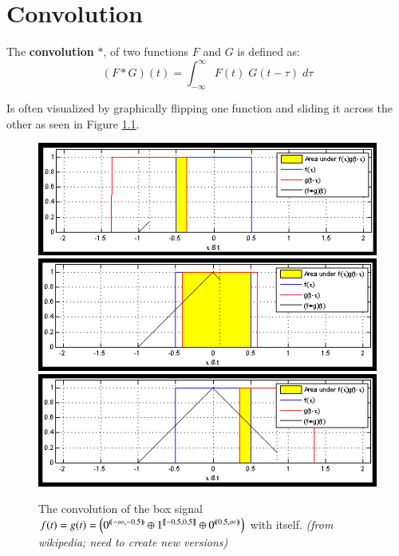 \chapter{Convolution}
\doublespacing

\begin{definition}
	The \textbf{convolution} $*$, of two functions $F$ and $G$ is defined as:
	\begin{equation}
		(F*G)(t) = \int_{-\infty}^\infty F(t) \;G(t - \tau) \; d\tau
	\end{equation}
\end{definition}

Is often visualized by graphically flipping one function and sliding it across the other as seen in Figure \ref{convolution}.

\begin{figure}[h]
\label{convolution}
\caption[Convolution of box signal with itself]{The convolution of the box signal 
$f(t)=g(t)=\left( 0^{ (\!( -\infty,-0.5 )\!) } \oplus 1^{ [\![ -0.5,0.5 ]\!] } \oplus 0^{ (\!( 0.5,\infty )\!) } \right)$ with itself.
\emph{(from wikipedia; need to create new versions)}}
\centering
\includegraphics[scale=0.6]{diagrams/conv1}
\includegraphics[scale=0.6]{diagrams/conv2}
\includegraphics[scale=0.6]{diagrams/conv3}
\end{figure}

